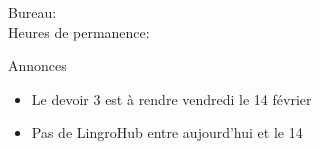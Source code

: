 \documentclass{beamer}
\subtitle[Articles et quantités]{Les articles (suite) et les adverbes de quantité}
\begin{document}
  \begin{frame}
    \titlepage
    \tiny{Bureau: \\
          Heures de permanence: }
  \end{frame}

  \begin{frame}{Annonces}
    \begin{itemize}
      \item Le devoir 3 est à rendre vendredi le 14 février
      \item Pas de LingroHub entre aujourd'hui et le 14
    \end{itemize}
  \end{frame}

\end{document}
